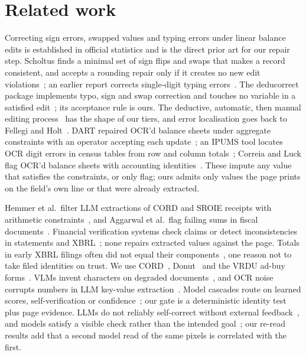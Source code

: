 \documentclass[10pt,twocolumn]{article}
\begin{document}
\section{Related work}\label{sec:related}

Correcting sign errors, swapped values and typing errors under linear balance edits is established in official statistics and is the direct prior art for our repair step. Scholtus finds a minimal set of sign flips and swaps that makes a record consistent, and accepts a rounding repair only if it creates no new edit violations~\citep{scholtus2011algorithms}; an earlier report corrects single-digit typing errors~\citep{scholtus2009typing}. The deducorrect package implements typo, sign and swap correction and touches no variable in a satisfied edit~\citep{vanderloo2011deducorrect}; its acceptance rule is ours. The deductive, automatic, then manual editing process~\citep{pannekoek2013automated} has the shape of our tiers, and error localisation goes back to Fellegi and Holt~\citep{fellegi1976systematic}. DART repaired OCR'd balance sheets under aggregate constraints with an operator accepting each update~\citep{fazzinga2006dart,flesca2010querying,bertossi2005complexity}; an IPUMS tool locates OCR digit errors in census tables from row and column totals~\citep{kugler2026ipums}; Correia and Luck flag OCR'd balance sheets with accounting identities~\citep{correia2023digitizing}. These impute any value that satisfies the constraints, or only flag; ours admits only values the page prints on the field's own line or that were already extracted.

Hemmer et al.\ filter LLM extractions of CORD and SROIE receipts with arithmetic constraints~\citep{hemmer2025neurosymbolic}, and Aggarwal et al.\ flag failing sums in fiscal documents~\citep{aggarwal2025fiscal}. Financial verification systems check claims or detect inconsistencies in statements and XBRL~\citep{hall2026verifin,panda2026finverbench,wang2026auditflow,wang2025finauditing,shu2025lava}; none repairs extracted values against the page. Totals in early XBRL filings often did not equal their components~\citep{debreceny2010add}, one reason not to take filed identities on trust. We use CORD~\citep{park2019cord}, Donut~\citep{kim2022donut} and the VRDU ad-buy forms~\citep{wang2023vrdu}. VLMs invent characters on degraded documents~\citep{he2025seeing}, and OCR noise corrupts numbers in LLM key-value extraction~\citep{anvari2026pixels}. Model cascades route on learned scores, self-verification or confidence~\citep{chen2024frugalgpt,aggarwal2024automix,shankar2026taskcascades,gupta2024cascades,jung2025trust}; our gate is a deterministic identity test plus page evidence. LLMs do not reliably self-correct without external feedback~\citep{huang2024cannot}, and models satisfy a visible check rather than the intended goal~\citep{zhong2025impossiblebench,baker2025monitoring}; our re-read results add that a second model read of the same pixels is correlated with the first.
\end{document}
